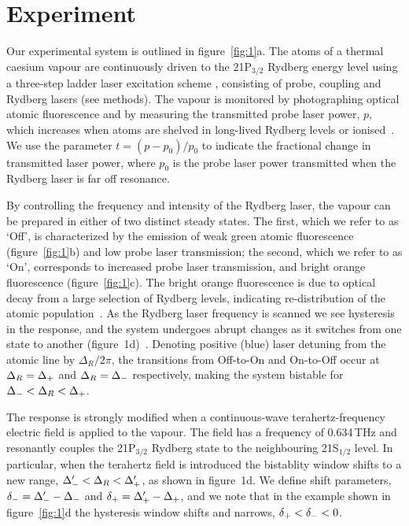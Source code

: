 \documentclass[twocolumn,aps,prl,nobibnotes,8pt]{revtex4-1}
\begin{document}
\section{Experiment}
\label{Exp}
\noindent
Our experimental system is outlined in figure~\ref{fig:1}a. 
The atoms of a thermal caesium vapour are continuously driven to the 21P$_{3/2}$ Rydberg energy level using a three-step ladder laser excitation scheme \cite{Carr12b}, consisting of probe, coupling and Rydberg lasers (see methods). 
The vapour is monitored by photographing optical atomic fluorescence and by measuring the transmitted probe laser power, $p$, which increases when atoms are shelved in long-lived Rydberg levels or ionised~\cite{Thoumany09}.
We use the parameter $t = (p - p_0) / p_0$ to indicate the fractional change in transmitted laser power, where $p_0$ is the probe laser power transmitted when the Rydberg laser is far off resonance.

By controlling the frequency and intensity of the Rydberg laser, the vapour can be prepared in either of two distinct steady states. 
The first, which we refer to as `Off', is characterized by the emission of weak green atomic fluorescence (figure~\ref{fig:1}b) and low probe laser transmission;
the second, which we refer to as `On', corresponds to increased probe laser transmission, and bright orange fluorescence (figure~\ref{fig:1}c).
The bright orange fluorescence is due to optical decay from a large selection of Rydberg levels, indicating re-distribution of the atomic population~\cite{Carr13,Wade17}.
As the Rydberg laser frequency is scanned we see hysteresis in the response, and the system undergoes abrupt changes as it switches from one state to another (figure~1d)~\cite{Carr13,Weller16}.
Denoting positive (blue) laser detuning from the atomic line by $\Delta_R / 2\pi$, the transitions from Off-to-On and On-to-Off occur at $\Delta_R = \Delta_{\rm{+}}$ and $\Delta_R = \Delta_{\rm{-}}$ respectively, making the system bistable for $\Delta_{\rm{-}} < \Delta_R < \Delta_{\rm{+}}$. 

The response is strongly modified when a continuous-wave terahertz-frequency electric field is applied to the vapour.
The field has a frequency of 0.634\,THz and resonantly couples the %
21P$_{3/2}$ Rydberg state to the neighbouring 21S$_{1/2}$ level. 
In particular, when the terahertz field is introduced the bistablity window shifts to a new range, $\Delta'_{\rm{-}} < \Delta_R < \Delta'_{\rm{+}}$, as shown in figure~1d. 
We define shift parameters, $\delta_{\rm{-}} = \Delta'_{\rm{-}} - \Delta_{\rm{-}}$ and  $\delta_{\rm{+}} = \Delta'_{\rm{+}} - \Delta_{\rm{+}}$, and we note that in the example shown in figure~\ref{fig:1}d the hysteresis window shifts and narrows, $\delta_{\rm{+}} < \delta_{\rm{-}} < 0$.
\end{document}
